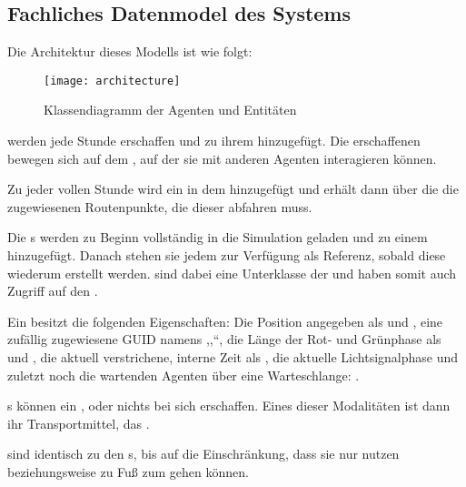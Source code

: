 %

\subsection{Fachliches Datenmodel des Systems}\label{subsec:data-model}

Die Architektur dieses Modells ist wie folgt:

\begin{figure}[h]
    \centering
    \texttt{[image: architecture]}
    \caption{Klassendiagramm der Agenten und Entitäten}
    \label{fig:class-diagramm}
\end{figure}

 werden jede Stunde erschaffen und zu ihrem  hinzugefügt.
Die erschaffenen  bewegen sich auf dem , auf der sie mit anderen Agenten interagieren können.

Zu jeder vollen Stunde wird ein  in dem  hinzugefügt und erhält dann über die  die zugewiesenen Routenpunkte, die dieser abfahren muss.

Die s werden zu Beginn vollständig in die Simulation geladen und zu einem  hinzugefügt.
Danach stehen sie jedem  zur Verfügung als Referenz, sobald diese wiederum erstellt werden.
 sind dabei eine Unterklasse der  und haben somit auch Zugriff auf den .


Ein  besitzt die folgenden Eigenschaften: Die Position angegeben als  und , eine zufällig zugewiesene GUID namens ,,``, die Länge der Rot- und Grünphase als  und , die aktuell verstrichene, interne Zeit als , die aktuelle Lichtsignalphase  und zuletzt noch die wartenden Agenten über eine Warteschlange: .

s können ein ,  oder nichts bei sich erschaffen.
Eines dieser Modalitäten ist dann ihr Transportmittel, das .

 sind identisch zu den s, bis auf die Einschränkung, dass sie nur  nutzen beziehungsweise zu Fuß zum  gehen können.


